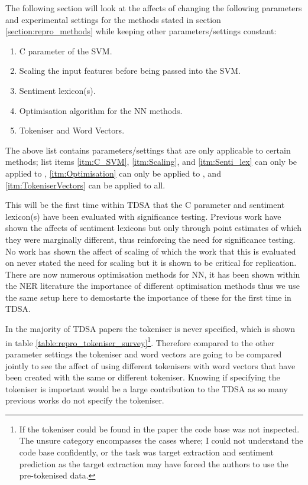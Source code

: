 The following section will look at the affects of changing the following parameters and experimental settings for the methods stated in section \ref{section:repro_methods} while keeping other parameters/settings constant:
\begin{enumerate}
    \item \label{itm:C_SVM} C parameter of the SVM.
    \item \label{itm:Scaling} Scaling the input features before being passed into the SVM.
    \item \label{itm:Senti_lex} Sentiment lexicon(s).
    \item \label{itm:Optimisation} Optimisation algorithm for the NN methods.
    \item \label{itm:TokeniserVectors} Tokeniser and Word Vectors.
\end{enumerate}
The above list contains parameters/settings that are only applicable to certain methods; list items \ref{itm:C_SVM}, \ref{itm:Scaling}, and \ref{itm:Senti_lex} can only be applied to \citet{repro_vo_2015, repro_wang_2017}, \ref{itm:Optimisation} can only be applied to \citet{repro_tang_2014}, and \ref{itm:TokeniserVectors} can be applied to all.

This will be the first time within TDSA that the C parameter and sentiment lexicon(s) have been evaluated with significance testing. Previous work \citep{repro_vo_2015} have shown the affects of sentiment lexicons but only through point estimates of which they were marginally different, thus reinforcing the need for significance testing. No work has shown the affect of scaling of which the work that this is evaluated on \citep{repro_vo_2015,repro_wang_2017} never stated the need for scaling but it is shown to be critical for replication. There are now numerous optimisation methods for NN, it has been shown within the NER literature \citep{repro_reimers_2017,repro_yang_2018} the importance of different optimisation methods thus we use the same setup here to demostarte the importance of these for the first time in TDSA.

In the majority of TDSA papers the tokeniser is never specified, which is shown in table \ref{table:repro_tokeniser_survey}\footnote{If the tokeniser could be found in the paper the code base was not inspected. The unsure category encompasses the cases where; I could not understand the code base confidently, or the task was target extraction and sentiment prediction as the target extraction may have forced the authors to use the pre-tokenised data.}. Therefore compared to the other parameter settings the tokeniser and word vectors are going to be compared jointly to see the affect of using different tokenisers with word vectors that have been created with the same or different tokeniser. Knowing if specifying the tokeniser is important would be a large contribution to the TDSA as so many previous works do not specify the tokeniser.

